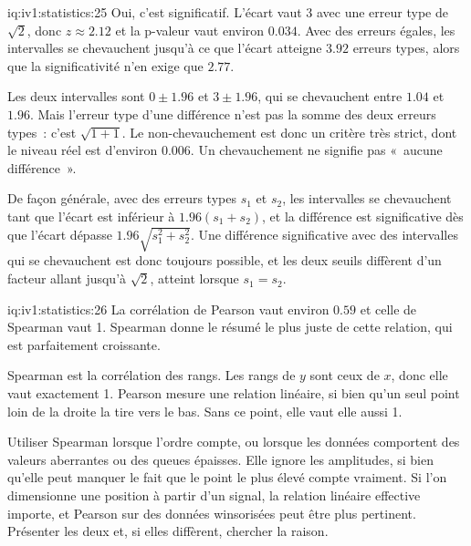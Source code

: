 \begin{solution}{iq:iv1:statistics:25}
Oui, c'est significatif. L'écart vaut 3 avec une erreur type de $\sqrt{2}$, donc $z \approx 2.12$ et la p-valeur vaut environ $0.034$. Avec des erreurs égales, les intervalles se chevauchent jusqu'à ce que l'écart atteigne $3.92$ erreurs types, alors que la significativité n'en exige que $2.77$.

Les deux intervalles sont $0 \pm 1.96$ et $3 \pm 1.96$, qui se chevauchent entre $1.04$ et $1.96$. Mais l'erreur type d'une différence n'est pas la somme des deux erreurs types~: c'est $\sqrt{1 + 1}$. Le non-chevauchement est donc un critère très strict, dont le niveau réel est d'environ $0.006$. Un chevauchement ne signifie pas «~aucune différence~».

De façon générale, avec des erreurs types $s_1$ et $s_2$, les intervalles se chevauchent tant que l'écart est inférieur à $1.96(s_1 + s_2)$, et la différence est significative dès que l'écart dépasse $1.96\sqrt{s_1^2 + s_2^2}$. Une différence significative avec des intervalles qui se chevauchent est donc toujours possible, et les deux seuils diffèrent d'un facteur allant jusqu'à $\sqrt{2}$, atteint lorsque $s_1 = s_2$.

\end{solution}

\begin{solution}{iq:iv1:statistics:26}
La corrélation de Pearson vaut environ $0.59$ et celle de Spearman vaut 1. Spearman donne le résumé le plus juste de cette relation, qui est parfaitement croissante.

Spearman est la corrélation des rangs. Les rangs de $y$ sont ceux de $x$, donc elle vaut exactement 1. Pearson mesure une relation linéaire, si bien qu'un seul point loin de la droite la tire vers le bas. Sans ce point, elle vaut elle aussi 1.

Utiliser Spearman lorsque l'ordre compte, ou lorsque les données comportent des valeurs aberrantes ou des queues épaisses. Elle ignore les amplitudes, si bien qu'elle peut manquer le fait que le point le plus élevé compte vraiment. Si l'on dimensionne une position à partir d'un signal, la relation linéaire effective importe, et Pearson sur des données winsorisées peut être plus pertinent. Présenter les deux et, si elles diffèrent, chercher la raison.

\end{solution}

